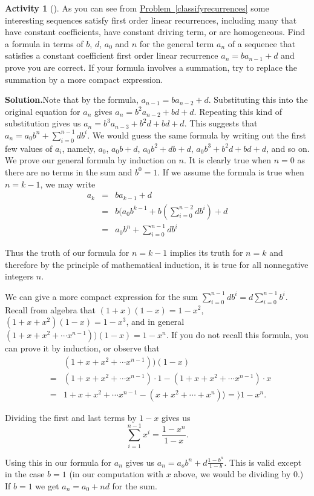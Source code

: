 \documentclass[10pt,]{book}
\theoremstyle{plain}
\theoremstyle{definition}
\newtheorem{activity}[project]{Activity}
\numberwithin{equation}{chapter}
\newcommand{\amp}{&}
\begin{document}
\begin{activity}[]\label{firstordlinconst}
As you can see from \hyperref[classifyrecurrences]{Problem~\ref{classifyrecurrences}} some interesting sequences satisfy first order linear recurrences, including many that have constant coefficients, have constant driving term, or are homogeneous. Find a formula in terms of \(b\), \(d\), \(a_0\) and \(n\) for the general term \(a_n\) of a sequence that satisfies a constant coefficient first order linear recurrence \(a_n = ba_{n-1} + d\) and prove you are correct. If your formula involves a summation, try to replace the summation by a more compact expression.%
\par\medskip\noindent%
\textbf{Solution.}\quad Note that by the formula, \(a_{n-1}=ba_{n-2} +d\). Substituting this into the original equation for \(a_n\) gives \(a_n=b^2a_{n-2}+bd +d\). Repeating this kind of substitution gives us \(a_n=b^3a_{n-3} +b^2d +bd +d\). This suggests that \(a_n = a_0b^n +\sum_{i=0}^{n-1}db^i\). We would guess the same formula by writing out the first few values of \(a_i\), namely, \(a_0\), \(a_0b+d\), \(a_0b^2+db+d\), \(a_0b^3+b^2d+bd+d\), and so on. We prove our general formula by induction on \(n\). It is clearly true when \(n=0\) as there are no terms in the sum and \(b^0=1\). If we assume the formula is true when \(n=k-1\), we may write%
\begin{align*}
a_k \amp =\amp  ba_{k-1}+d\\
\amp =\amp b(a_0b^{k-1}+ b\left(\sum_{i=0}^{n-2}db^i\right) +d\\
\amp =\amp a_0b^n +\sum_{i=0}^{n-1}db^i
\end{align*}
%
\par
Thus the truth of our formula for \(n=k-1\) implies its truth for \(n=k\) and therefore by the principle of mathematical induction, it is true for all nonnegative integers \(n\).%
\par
We can give a more compact expression for the sum \(\sum_{i=0}^{n-1}db^i=d\sum_{i=0}^{n-1}b^i\). Recall from algebra that \((1+x)(1-x)= 1-x^2\), \((1+x+x^2)(1-x) = 1-x^3\), and in general \((1+x+x^2+\cdots
x^{n-1}))(1-x) = 1-x^n\). If you do not recall this formula, you can prove it by induction, or observe that%
\begin{align*}
\amp \amp (1+x+x^2+\cdots
x^{n-1}))(1-x)\\
\amp =\amp  (1+x+x^2+\cdots
x^{n-1})\cdot 1-(1+x+x^2+\cdots
x^{n-1})\cdot x\\
\amp =\amp  1+x+x^2+\cdots x^{n-1}-(x+x^2+\cdots+x^n)\rangle =\rangle  1-x^n.
\end{align*}
%
\par
Dividing the first and last terms by \(1-x\) gives us%
\begin{equation*}
\sum_{i=1}^{n-1}x^i=\frac{1-x^n}{1-x}.
\end{equation*}
%
\par
Using this in our formula for \(a_n\) gives us \(a_n =a_ob^n+d\frac{1-b^n}{1-b}.\) This is valid except in the case \(b=1\) (in our computation with \(x\) above, we would be dividing by 0.) If \(b=1\) we get \(a_n =a_0 +nd\) for the sum.%
\end{activity}
\end{document}

